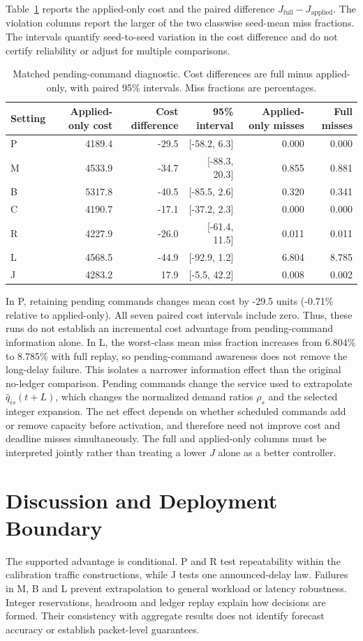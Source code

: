 \documentclass{IEEEoj}
\begin{document}
Table~\ref{tab:pending} reports the applied-only cost and the paired difference $J_{\mathrm{full}}-J_{\mathrm{applied}}$. The violation columns report the larger of the two classwise seed-mean miss fractions. The intervals quantify seed-to-seed variation in the cost difference and do not certify reliability or adjust for multiple comparisons.
\begin{table}[t]
\caption{Matched pending-command diagnostic. Cost differences are full minus applied-only, with paired 95\% intervals. Miss fractions are percentages.}
\label{tab:pending}
\centering\small
\begin{tabular}{lrrrrr}
\toprule
Setting & Applied-only cost & Cost difference & 95\% interval & Applied-only misses & Full misses\\
\midrule
P & 4189.4 & -29.5 & [-58.2, 6.3] & 0.000 & 0.000\\
M & 4533.9 & -34.7 & [-88.3, 20.3] & 0.855 & 0.881\\
B & 5317.8 & -40.5 & [-85.5, 2.6] & 0.320 & 0.341\\
C & 4190.7 & -17.1 & [-37.2, 2.3] & 0.000 & 0.000\\
R & 4227.9 & -26.0 & [-61.4, 11.5] & 0.011 & 0.011\\
L & 4568.5 & -44.9 & [-92.9, 1.2] & 6.804 & 8.785\\
J & 4283.2 & 17.9 & [-5.5, 42.2] & 0.008 & 0.002\\
\bottomrule
\end{tabular}
\end{table}
In P, retaining pending commands changes mean cost by -29.5 units (-0.71\% relative to applied-only). All seven paired cost intervals include zero. Thus, these runs do not establish an incremental cost advantage from pending-command information alone. In L, the worst-class mean miss fraction increases from 6.804\% to 8.785\% with full replay, so pending-command awareness does not remove the long-delay failure. This isolates a narrower information effect than the original no-ledger comparison. Pending commands change the service used to extrapolate $\widehat q_{is}(t+L)$, which changes the normalized demand ratios $\rho_s$ and the selected integer expansion. The net effect depends on whether scheduled commands add or remove capacity before activation, and therefore need not improve cost and deadline misses simultaneously. The full and applied-only columns must be interpreted jointly rather than treating a lower $J$ alone as a better controller.

\section{Discussion and Deployment Boundary}
The supported advantage is conditional. P and R test repeatability within
the calibration traffic constructions, while J tests one announced-delay
law. Failures in M, B and L prevent extrapolation to general workload or
latency robustness. Integer reservations, headroom and ledger replay explain
how decisions are formed. Their consistency with aggregate results does not
identify forecast accuracy or establish packet-level guarantees.
\end{document}
